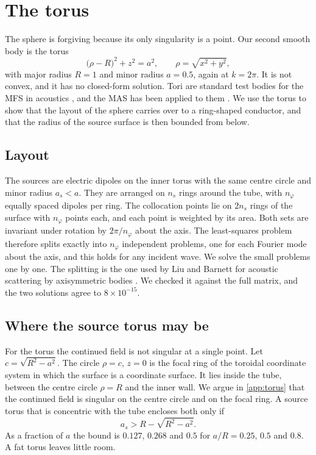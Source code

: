 \section{The torus}
\label{sec:torus}

The sphere is forgiving because its only singularity is a point. Our second smooth body is the torus
\begin{equation}
  \bigl(\rho - R\bigr)^2 + z^2 = a^2, \qquad \rho = \sqrt{x^2+y^2},
\end{equation}
with major radius $R = 1$ and minor radius $a = 0.5$, again at $k = 2\pi$. It is not convex, and it has no closed-form solution. Tori are standard test bodies for the MFS in acoustics \cite{cai2026}, and the MAS has been applied to them \cite{zaridze2004}. We use the torus to show that the layout of the sphere carries over to a ring-shaped conductor, and that the radius of the source surface is then bounded from below.

\subsection{Layout}

The sources are electric dipoles on the inner torus with the same centre circle and minor radius $a_s < a$. They are arranged on $n_s$ rings around the tube, with $n_\varphi$ equally spaced dipoles per ring. The collocation points lie on $2n_s$ rings of the surface with $n_\varphi$ points each, and each point is weighted by its area. Both sets are invariant under rotation by $2\pi/n_\varphi$ about the axis. The least-squares problem therefore splits exactly into $n_\varphi$ independent problems, one for each Fourier mode about the axis, and this holds for any incident wave. We solve the small problems one by one. The splitting is the one used by Liu and Barnett for acoustic scattering by axisymmetric bodies \cite{liu2016}. We checked it against the full matrix, and the two solutions agree to $8\times10^{-15}$.

\subsection{Where the source torus may be}

For the torus the continued field is not singular at a single point. Let $c = \sqrt{R^2-a^2}$. The circle $\rho = c$, $z = 0$ is the focal ring of the toroidal coordinate system in which the surface is a coordinate surface. It lies inside the tube, between the centre circle $\rho = R$ and the inner wall. We argue in \ref{app:torus} that the continued field is singular on the centre circle and on the focal ring. A source torus that is concentric with the tube encloses both only if
\begin{equation}
  a_s > R - \sqrt{R^2-a^2}.
  \label{eq:torusradius}
\end{equation}
As a fraction of $a$ the bound is $0.127$, $0.268$ and $0.5$ for $a/R = 0.25$, $0.5$ and $0.8$. A fat torus leaves little room.


